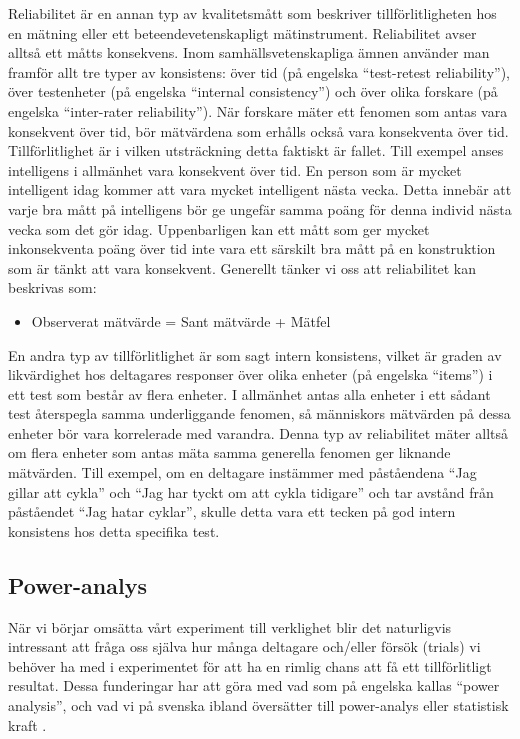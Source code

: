 \documentclass[
]{book}
\providecommand{\tightlist}{%
  \setlength{\itemsep}{0pt}\setlength{\parskip}{0pt}}
\begin{document}
Reliabilitet är en annan typ av kvalitetsmått som beskriver tillförlitligheten hos en mätning eller ett beteendevetenskapligt mätinstrument. Reliabilitet avser alltså ett måtts konsekvens. Inom samhällsvetenskapliga ämnen använder man framför allt tre typer av konsistens: över tid (på engelska ``test-retest reliability''), över testenheter (på engelska ``internal consistency'') och över olika forskare (på engelska ``inter-rater reliability''). När forskare mäter ett fenomen som antas vara konsekvent över tid, bör mätvärdena som erhålls också vara konsekventa över tid. Tillförlitlighet är i vilken utsträckning detta faktiskt är fallet. Till exempel anses intelligens i allmänhet vara konsekvent över tid. En person som är mycket intelligent idag kommer att vara mycket intelligent nästa vecka. Detta innebär att varje bra mått på intelligens bör ge ungefär samma poäng för denna individ nästa vecka som det gör idag. Uppenbarligen kan ett mått som ger mycket inkonsekventa poäng över tid inte vara ett särskilt bra mått på en konstruktion som är tänkt att vara konsekvent. Generellt tänker vi oss att reliabilitet kan beskrivas som:

\begin{itemize}
\tightlist
\item
  Observerat mätvärde = Sant mätvärde + Mätfel
\end{itemize}

En andra typ av tillförlitlighet är som sagt intern konsistens, vilket är graden av likvärdighet hos deltagares responser över olika enheter (på engelska ``items'') i ett test som består av flera enheter. I allmänhet antas alla enheter i ett sådant test återspegla samma underliggande fenomen, så människors mätvärden på dessa enheter bör vara korrelerade med varandra. Denna typ av reliabilitet mäter alltså om flera enheter som antas mäta samma generella fenomen ger liknande mätvärden. Till exempel, om en deltagare instämmer med påståendena ``Jag gillar att cykla'' och ``Jag har tyckt om att cykla tidigare'' och tar avstånd från påståendet ``Jag hatar cyklar'', skulle detta vara ett tecken på god intern konsistens hos detta specifika test.

\hypertarget{sub07.1.2}{%
\subsection{Power-analys}\label{sub07.1.2}}

När vi börjar omsätta vårt experiment till verklighet blir det naturligvis intressant att fråga oss själva hur många deltagare och/eller försök (trials) vi behöver ha med i experimentet för att ha en rimlig chans att få ett tillförlitligt resultat. Dessa funderingar har att göra med vad som på engelska kallas ``power analysis'', och vad vi på svenska ibland översätter till power-analys eller statistisk kraft \citep{ellis2010essential, sullivan2012using, cumming2013understanding}.
\end{document}
